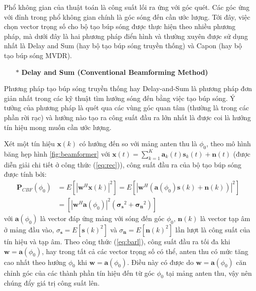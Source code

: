 Phổ không gian của thuật toán là công suất lối ra ứng với góc quét. Các góc ứng với đỉnh trong phổ không gian chính là góc sóng đến cần ước lượng. Tới đây, việc chọn vector trọng số cho bộ tạo búp sóng được thực hiện theo nhiều phương pháp, mà dưới đây là hai phương pháp điển hình và thường xuyên được sử dụng nhất là Delay and Sum (hay bộ tạo búp sóng truyền thống) và Capon (hay bộ tạo búp sóng MVDR). 

\begin{itemize}
	\item[$\ast$] \textbf{Delay and Sum (Conventional Beamforming Method)}
\end{itemize}

Phương pháp tạo búp sóng truyền thống hay Delay-and-Sum \cite{Liberti1999} là phương pháp đơn giản nhất trong các kỹ thuật tìm hướng sóng đến bằng việc tạo búp sóng. Ý tưởng của phương pháp là quét qua các vùng góc quan tâm (thường là trong các phần rời rạc) và hướng nào tạo ra công suất đầu ra lớn nhất là được coi là hướng tín hiệu mong muốn cần ước lượng.

Xét một tín hiệu $\mathbf{x}(k)$ có hướng đến so với mảng anten thu là ${\phi}_{0}$, theo mô hình băng hẹp hình \ref{fig:beamformer} với $\mathbf{x}(t) = \sum_{k=1}^{K}\mathbf{a}_{k}(t)\mathbf{s}_{k}(t) + \mathbf{n}(t)$ (được diễn giải chi tiết ở công thức (\ref{eq:rec})), công suất đầu ra của bộ tạo búp sóng được tính bởi:
\begin{equation}
\begin{split}
	\mathbf{P}_{CBF}(\phi_{0}) &= E[|\mathbf{w}^{H}\mathbf{x}(k)|^{2}] = E[|\mathbf{w}^{H}(\mathbf{a}(\phi_{0})\mathbf{s}(k) + \mathbf{n}(k))|^{2}] \\
	&= [|\mathbf{w}^{H}\mathbf{a}(\phi_{0})|^{2}({\mathbf{\sigma}_{\mathbf{s}}}^{2} + {\mathbf{\sigma}_{\mathbf{n}}}^{2})]
\end{split}
\label{eq:barl}
\end{equation}
với $\mathbf{a}(\phi_{0})$ là vector đáp ứng mảng với sóng đến góc $\phi_{0}$, $\mathbf{n}(k)$ là vector tạp âm ở mảng đầu vào, $\sigma_{\mathbf{s}} = E[\mathbf{s}(k)^{2}]$ và $\sigma_{\mathbf{n}} = E[\mathbf{n}(k)^{2}]$ lần lượt là công suất của tín hiệu và tạp âm. Theo công thức (\ref{eq:barl}), công suất đầu ra tối đa khi $\mathbf{w} = \mathbf{a}(\phi_{0})$, hay trong tất cả các vector trọng số có thể, anten thu có mức tăng cao nhất theo hướng $\phi_{0}$ khi $\mathbf{w} = \mathbf{a}(\phi_{0})$. Điều này có được do $\mathbf{w} = \mathbf{a}(\phi_{0})$ căn chỉnh góc của các thành phần tín hiệu đến từ góc $\phi_{0}$ tại mảng anten thu, vậy nên chúng đẩy giá trị công suất lên.

